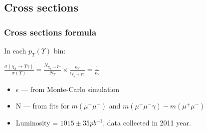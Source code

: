 \documentclass{beamer}
\begin{document}
\subsection{Cross sections}
\begin{frame}
\frametitle{Cross sections formula}
In each $p_T(\Upsilon)$ bin:
\begin{center}
$\frac{\sigma(\chi_{b} \rightarrow \Upsilon \gamma)}{\sigma(\Upsilon)} = \frac{N_{\chi_b \rightarrow \Upsilon \gamma}}{N_{\Upsilon}} \times \frac{\epsilon_{\Upsilon}}{\epsilon_{\chi_b \rightarrow \Upsilon \gamma}} = \frac{1}{\epsilon_{\gamma}}$
\end{center}
\begin{itemize}
  \item $\epsilon$ --- from Monte-Carlo simulation
  \item N --- from fits for $m(\mu^+ \mu^-)$ and $m(\mu^+ \mu^- \gamma) - m(\mu^+ \mu^-)$
  \item Luminosity = $1015 \pm 35 pb^{-1}$, data collected in 2011 year.
\end{itemize}
\end{frame}
\end{document}
